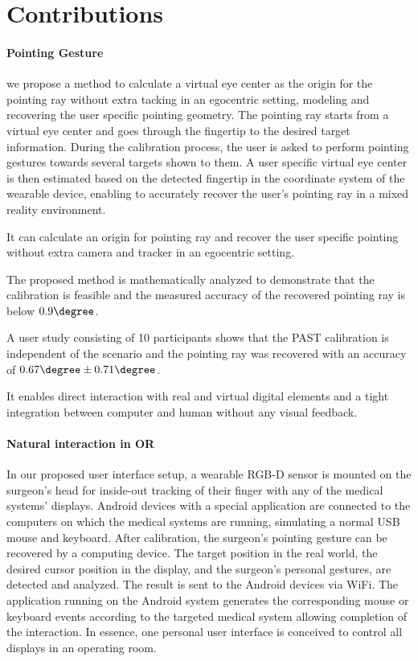 \section{Contributions}

\paragraph{Pointing Gesture}
we propose a method to calculate a virtual eye center as the origin for the pointing ray without extra tacking in an egocentric setting, modeling and recovering the user specific pointing geometry. 
The pointing ray starts from a virtual eye center and goes through the fingertip to the desired target information. During the calibration process, the user is asked to perform pointing gestures towards several targets shown to them. A user specific virtual eye center is then estimated based on the detected fingertip in the coordinate system of the wearable device, enabling to accurately recover the user's pointing ray in a mixed reality environment. 

\begin{description} [font=$\bullet$\scshape\bfseries]
	\item It can calculate an origin for pointing ray and recover the user specific pointing without extra camera and tracker in an egocentric setting.
	\item The proposed method is mathematically analyzed to demonstrate that the calibration is feasible and the measured accuracy of the recovered pointing ray is below $0.9\degree$.
	\item A user study consisting of 10 participants shows that the PAST calibration is independent of the scenario and the pointing ray was recovered with an accuracy of $0.67\degree\pm0.71\degree$.
	\item It enables direct interaction with real and virtual digital elements and a tight integration between computer and human without any visual feedback.
\end{description}

\paragraph{Natural interaction in OR}
In our proposed user interface setup, a wearable RGB-D sensor is mounted on the surgeon's head for inside-out tracking of their finger with any of the medical systems' displays. Android devices with a special application are connected to the computers on which the medical systems are running, simulating a normal USB mouse and keyboard. 
After calibration, the surgeon's pointing gesture can be recovered by a computing device. The target position in the real world, the desired cursor position in the display, and the surgeon's personal gestures, are detected and analyzed. The result is sent to the Android devices via WiFi. The application running on the Android system generates the corresponding mouse or keyboard events according to the targeted medical system allowing completion of the interaction. In essence, one personal user interface is conceived to control all displays in an operating room.

